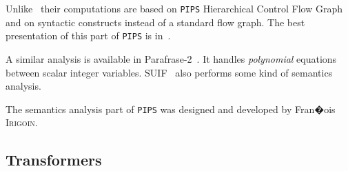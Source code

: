 \documentclass[a4paper]{report}
\newcommand{\Pips}{\texttt{PIPS}}
\begin{document}
Unlike~\cite{CH78} their computations are based on \Pips{}
Hierarchical Control Flow Graph and on syntactic constructs instead of a
standard flow graph. The best presentation of this part of \Pips{} is
in~\cite{Iri92}.

A similar analysis is available in Parafrase-2~\cite{}. It handles {\em
polynomial} equations between scalar integer variables. SUIF~\cite{}
also performs some kind of semantics analysis.

The semantics analysis part of \Pips{} was designed and developed by
Fran�ois \textsc{Irigoin}.

\subsection{Transformers}
\label{subsubsection-transformers}

\end{document}
